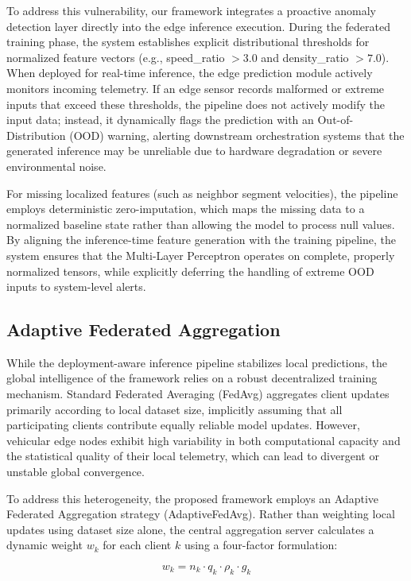 To address this vulnerability, our framework integrates a proactive anomaly detection layer directly into the edge inference execution. During the federated training phase, the system establishes explicit distributional thresholds for normalized feature vectors (e.g., speed\_ratio $> 3.0$ and density\_ratio $> 7.0$). When deployed for real-time inference, the edge prediction module actively monitors incoming telemetry. If an edge sensor records malformed or extreme inputs that exceed these thresholds, the pipeline does not actively modify the input data; instead, it dynamically flags the prediction with an Out-of-Distribution (OOD) warning, alerting downstream orchestration systems that the generated inference may be unreliable due to hardware degradation or severe environmental noise.

For missing localized features (such as neighbor segment velocities), the pipeline employs deterministic zero-imputation, which maps the missing data to a normalized baseline state rather than allowing the model to process null values. By aligning the inference-time feature generation with the training pipeline, the system ensures that the Multi-Layer Perceptron operates on complete, properly normalized tensors, while explicitly deferring the handling of extreme OOD inputs to system-level alerts.

\subsection{Adaptive Federated Aggregation} 

While the deployment-aware inference pipeline stabilizes local predictions, the global intelligence of the framework relies on a robust decentralized training mechanism. Standard Federated Averaging (FedAvg) aggregates client updates primarily according to local dataset size, implicitly assuming that all participating clients contribute equally reliable model updates. However, vehicular edge nodes exhibit high variability in both computational capacity and the statistical quality of their local telemetry, which can lead to divergent or unstable global convergence.

To address this heterogeneity, the proposed framework employs an Adaptive Federated Aggregation strategy (AdaptiveFedAvg). Rather than weighting local updates using dataset size alone, the central aggregation server calculates a dynamic weight $w_k$ for each client $k$ using a four-factor formulation:

\begin{equation}
w_k = n_k \cdot q_k \cdot \rho_k \cdot g_k
\end{equation}

